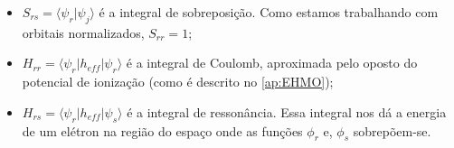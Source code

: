 \begin{itemize}
    \item $\displaystyle S_{rs} = \langle \psi_r | \psi_j \rangle$ é a integral de sobreposição. Como estamos trabalhando com orbitais normalizados, $S_{rr} = 1$;
    
    \item $\displaystyle H_{rr} = \langle \psi_r | h_{eff} | \psi_r \rangle$ é a integral de Coulomb, aproximada pelo oposto do potencial de ionização (como é descrito no \autoref{ap:EHMO});
    
    \item $\displaystyle H_{rs} = \langle \psi_r | h_{eff} | \psi_s \rangle$ é a integral de ressonância. Essa integral nos dá a energia de um elétron na região do espaço onde as funções $\phi_r$ e, $\phi_s$ sobrepõem-se. 
\end{itemize}







